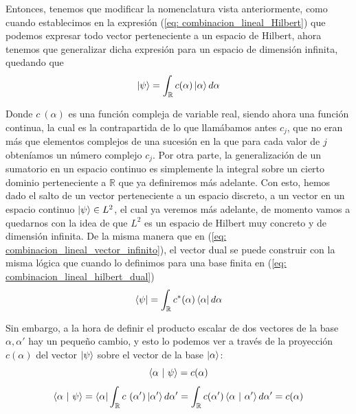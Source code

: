 \documentclass[12pt]{article}
\numberwithin{equation}{section} %
\begin{document}
    \vspace{2.5mm}

    Entonces, tenemos que modificar la nomenclatura vista anteriormente, como cuando establecimos en la expresión (\ref{eq: combinacion_lineal_Hilbert}) que podemos expresar todo vector perteneciente a un espacio de Hilbert, ahora tenemos que generalizar dicha expresión para un espacio de dimensión infinita, quedando que
    \begin{equation}
        \ket{\psi} = \int_{\mathbb{R}} c (\alpha) \ket{\alpha} d \alpha
        \label{eq: combinacion_lineal_vector_infinito}
    \end{equation}

    \vspace{2.5mm}

    Donde \( c \ (\alpha) \) es una función compleja de variable real, siendo ahora una función continua, la cual es la contrapartida de lo que llamábamos antes \( c_{j} \), que no eran más que elementos complejos de una sucesión en la que para cada valor de \( j \) obteníamos un número complejo \( c_{j} \). Por otra parte, la generalización de un sumatorio en un espacio continuo es simplemente la integral sobre un cierto dominio perteneciente a \( \mathbb{R} \) que ya definiremos más adelante. Con esto, hemos dado el salto de un vector perteneciente a un espacio discreto, a un vector en un espacio continuo \( \ket{\psi} \in L^{2} \), el cual ya veremos más adelante, de momento vamos a quedarnos con la idea de que \( L^{2} \) es un espacio de Hilbert muy concreto y de dimensión infinita. De la misma manera que en (\ref{eq: combinacion_lineal_vector_infinito}), el vector dual se puede construir con la misma lógica que cuando lo definimos para una base finita en (\ref{eq: combinacion_lineal_hilbert_dual})
    \begin{equation}
        \bra{\psi} = \int_{\mathbb{R}} c^{*} (\alpha) \bra{\alpha} d \alpha
    \end{equation}

    \vspace{2.5mm}

    Sin embargo, a la hora de definir el producto escalar de dos vectores de la base \( \alpha, \alpha' \) hay un pequeño cambio, y esto lo podemos ver a través de la proyección \( c (\alpha) \) del vector \( \ket{\psi} \) sobre el vector de la base \( \ket{\alpha} \):
    \begin{equation*}
        \braket{\alpha \ | \ \psi} = c (\alpha) 
    \end{equation*}
    \begin{equation*}
        \braket{\alpha \ | \ \psi} = \bra{\alpha} \int_{\mathbb{R}} c \ (\alpha') \ket{\alpha'} d \alpha' = \int_{\mathbb{R}} c (\alpha') \braket{\alpha \ | \ \alpha'} d \alpha' = c (\alpha)
    \end{equation*}
\end{document}
